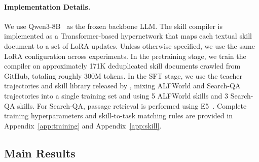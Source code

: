 \paragraph{Implementation Details.}
We use Qwen3-8B~\citep{Yang2025Qwen3} as the frozen backbone LLM. The skill compiler is implemented as a Transformer-based hypernetwork that maps each textual skill document to a set of LoRA updates. Unless otherwise specified, we use the same LoRA configuration across experiments. In the pretraining stage, we train the compiler on approximately 171K deduplicated skill documents crawled from GitHub, totaling roughly 300M tokens. In the SFT stage, we use the teacher trajectories and skill library released by \citet{Xia2026SkillRL}, mixing ALFWorld and Search-QA trajectories into a single training set and using 5 ALFWorld skills and 3 Search-QA skills. For Search-QA, passage retrieval is performed using E5~\citep{Wang2022E5}. Complete training hyperparameters and skill-to-task matching rules are provided in Appendix~\ref{app:training} and Appendix~\ref{app:skill}.

\subsection{Main Results}

